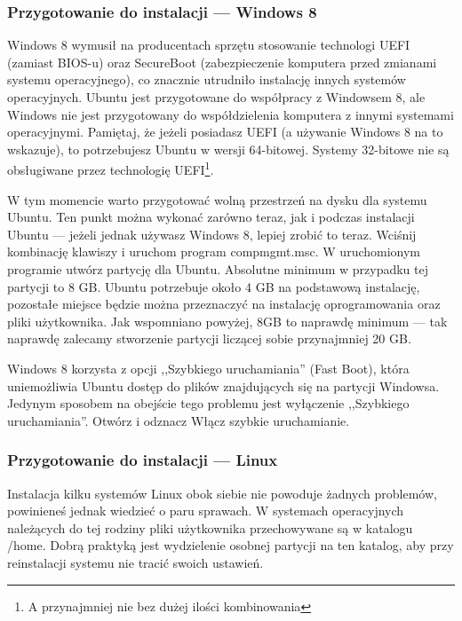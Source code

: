 \subsubsection{Przygotowanie do instalacji --- Windows 8}
\label{sec:przygotowanie_windows8}
Windows 8 wymusił na producentach sprzętu stosowanie technologi UEFI (zamiast BIOS-u) oraz SecureBoot (zabezpieczenie komputera przed zmianami systemu operacyjnego), co znacznie utrudniło instalację innych systemów operacyjnych. Ubuntu jest przygotowane do współpracy z Windowsem 8, ale Windows nie jest przygotowany do współdzielenia komputera z innymi systemami operacyjnymi. Pamiętaj, że jeżeli posiadasz UEFI (a używanie Windows 8 na to wskazuje), to potrzebujesz Ubuntu w wersji 64-bitowej. Systemy 32-bitowe nie są obsługiwane przez technologię UEFI\footnote{A przynajmniej nie bez dużej ilości kombinowania}.

W tym momencie warto przygotować wolną przestrzeń na dysku dla systemu Ubuntu. Ten punkt można wykonać zarówno teraz, jak i podczas instalacji Ubuntu --- jeżeli jednak używasz Windows 8, lepiej zrobić to teraz. Wciśnij kombinację klawiszy  i uruchom program \textcolor{ubuntu_orange}{compmgmt.msc}. W uruchomionym programie utwórz partycję dla Ubuntu. Absolutne minimum w przypadku tej partycji to 8 GB. Ubuntu potrzebuje około 4 GB na podstawową instalację, pozostałe miejsce będzie można przeznaczyć na instalację oprogramowania oraz pliki użytkownika. Jak wspomniano powyżej, 8GB to naprawdę minimum --- tak naprawdę zalecamy stworzenie partycji liczącej sobie przynajmniej 20 GB.

Windows 8 korzysta z opcji ,,Szybkiego uruchamiania'' (Fast Boot), która uniemożliwia Ubuntu dostęp do plików znajdujących się na partycji Windowsa. Jedynym sposobem na obejście tego problemu jest wyłączenie ,,Szybkiego uruchamiania''. Otwórz  i odznacz \textcolor{ubuntu_orange}{Włącz szybkie uruchamianie}.
\subsubsection{Przygotowanie do instalacji --- Linux}
\label{sec:przygotowanie_linux}
Instalacja kilku systemów Linux obok siebie nie powoduje żadnych problemów, powinieneś jednak wiedzieć o paru sprawach. W systemach operacyjnych należących do tej rodziny pliki użytkownika przechowywane są w katalogu /home. Dobrą praktyką jest wydzielenie osobnej partycji na ten katalog, aby przy reinstalacji systemu nie tracić swoich ustawień.

